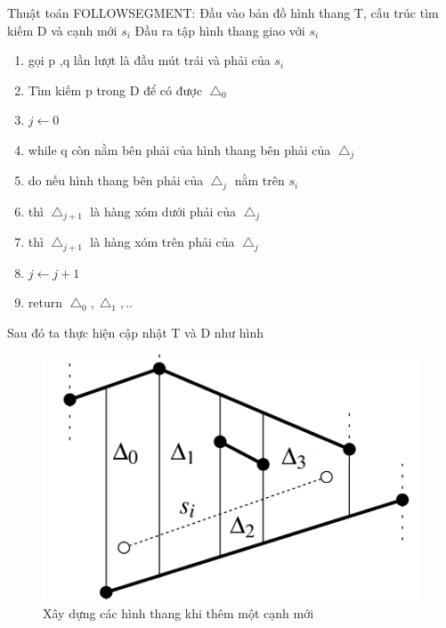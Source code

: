 \documentclass[a4paper,12pt]{report}
\begin{document}
Thuật toán FOLLOWSEGMENT:
Đầu vào bản đồ hình thang T, cấu trúc tìm kiếm D và cạnh mới $s_i$
Đầu ra tập hình thang giao với $s_i$
\begin{enumerate}
\item gọi p ,q lần lượt là đầu mút trái và phải của $s_i$
\item Tìm kiếm p trong D để có được $\bigtriangleup_0$
\item $j \longleftarrow 0$
\item while q còn nằm bên phải của hình thang bên phải của $\bigtriangleup_j$ 
\item do nếu hình thang bên phải của $\bigtriangleup_j$ nằm trên $s_i$ 
\item thì  $\bigtriangleup_{j+1}$ là hàng xóm dưới phải của $\bigtriangleup_{j}$ 
\item thì  $\bigtriangleup_{j+1}$ là hàng xóm trên phải của $\bigtriangleup_{j}$ 
\item $j \longleftarrow j+1$
\item return $\bigtriangleup_0,\bigtriangleup_1,..$
\end{enumerate}
Sau đó ta thực hiện cập nhật T và D  như hình
\begin{figure}[H]
\centering
\includegraphics[scale=0.28]{trmap2.png}
\caption{Xây dựng các hình thang khi thêm một cạnh mới}
\label{object_pic}
\end{figure}
\end{document}
